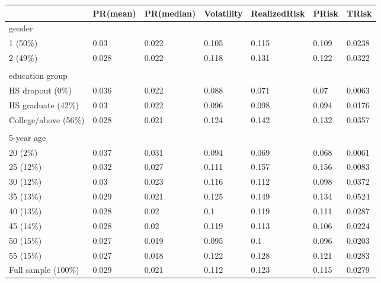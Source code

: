 \begin{table}
{\begin{tabular}{lllllll}
\hline \hline 
                       & PR(mean)   & PR(median) & Volatility & RealizedRisk & PRisk & TRisk  \\
                       \hline 
gender                 &            &            &                    &              &       &        \\
\hline 
1 (50\%)               & 0.03       & 0.022      & 0.105              & 0.115        & 0.109 & 0.0238 \\
2 (49\%)               & 0.028      & 0.022      & 0.118              & 0.131        & 0.122 & 0.0322 \\
                       &            &            &                    &              &       &        \\
                       \hline 
\multicolumn{2}{l}{education group} &            &                    &              &       &        \\
\hline 
HS dropout (0\%)       & 0.036      & 0.022      & 0.088              & 0.071        & 0.07  & 0.0063 \\
HS graduate (42\%)     & 0.03       & 0.022      & 0.096              & 0.098        & 0.094 & 0.0176 \\
College/above (56\%)   & 0.028      & 0.021      & 0.124              & 0.142        & 0.132 & 0.0357 \\
                       &            &            &                    &              &       &        \\
                       \hline 
5-year age             &            &            &                    &              &       &        \\
\hline 
20 (2\%)               & 0.037      & 0.031      & 0.094              & 0.069        & 0.068 & 0.0061 \\
25 (12\%)              & 0.032      & 0.027      & 0.111              & 0.157        & 0.156 & 0.0083 \\
30 (12\%)              & 0.03       & 0.023      & 0.116              & 0.112        & 0.098 & 0.0372 \\
35 (13\%)              & 0.029      & 0.021      & 0.125              & 0.149        & 0.134 & 0.0524 \\
40 (13\%)              & 0.028      & 0.02       & 0.1                & 0.119        & 0.111 & 0.0287 \\
45 (14\%)              & 0.028      & 0.02       & 0.119              & 0.113        & 0.106 & 0.0224 \\
50 (15\%)              & 0.027      & 0.019      & 0.095              & 0.1          & 0.096 & 0.0203 \\
55 (15\%)              & 0.027      & 0.018      & 0.122              & 0.128        & 0.121 & 0.0283 \\
\hline 
Full sample (100\%)          & 0.029      & 0.021      & 0.112              & 0.123        & 0.115 & 0.0279 \\
\hline \hline 
\end{tabular}

}
\end{table}

